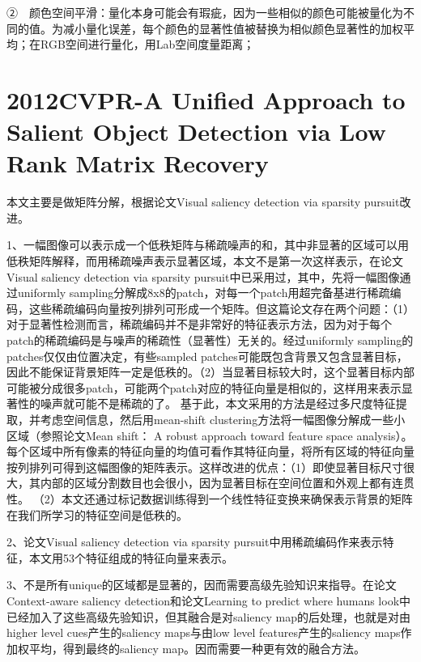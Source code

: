 \documentclass[a4paper,12pt]{article}
\begin{document}
②　颜色空间平滑：量化本身可能会有瑕疵，因为一些相似的颜色可能被量化为不同的值。为减小量化误差，每个颜色的显著性值被替换为相似颜色显著性的加权平均；在RGB空间进行量化，用Lab空间度量距离；


\section{2012CVPR-A Unified Approach to Salient Object Detection via Low Rank Matrix Recovery}

本文主要是做矩阵分解，根据论文Visual saliency detection via sparsity pursuit改进。

1、一幅图像可以表示成一个低秩矩阵与稀疏噪声的和，其中非显著的区域可以用低秩矩阵解释，而用稀疏噪声表示显著区域，本文不是第一次这样表示，在论文Visual saliency detection via sparsity pursuit中已采用过，其中，先将一幅图像通过uniformly sampling分解成8x8的patch，对每一个patch用超完备基进行稀疏编码，这些稀疏编码向量按列排列可形成一个矩阵。但这篇论文存在两个问题：（1）对于显著性检测而言，稀疏编码并不是非常好的特征表示方法，因为对于每个patch的稀疏编码是与噪声的稀疏性（显著性）无关的。经过uniformly sampling的patches仅仅由位置决定，有些sampled patches可能既包含背景又包含显著目标，因此不能保证背景矩阵一定是低秩的。（2）当显著目标较大时，这个显著目标内部可能被分成很多patch，可能两个patch对应的特征向量是相似的，这样用来表示显著性的噪声就可能不是稀疏的了。
  基于此，本文采用的方法是经过多尺度特征提取，并考虑空间信息，然后用mean-shift clustering方法将一幅图像分解成一些小区域（参照论文Mean shift： A robust approach toward feature space analysis）。每个区域中所有像素的特征向量的均值可看作其特征向量，将所有区域的特征向量按列排列可得到这幅图像的矩阵表示。这样改进的优点：（1）即使显著目标尺寸很大，其内部的区域分割数目也会很小，因为显著目标在空间位置和外观上都有连贯性。
（2）本文还通过标记数据训练得到一个线性特征变换来确保表示背景的矩阵在我们所学习的特征空间是低秩的。

2、论文Visual saliency detection via sparsity pursuit中用稀疏编码作来表示特征，本文用53个特征组成的特征向量来表示。

3、不是所有unique的区域都是显著的，因而需要高级先验知识来指导。在论文Context-aware saliency detection和论文Learning to predict where humans look中已经加入了这些高级先验知识，但其融合是对saliency map的后处理，也就是对由higher level cues产生的saliency maps与由low level features产生的saliency maps作加权平均，得到最终的saliency map。因而需要一种更有效的融合方法。
\end{document}
